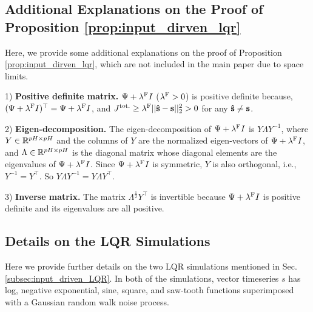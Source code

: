\subsection{Additional Explanations on the Proof of Proposition \ref{prop:input_dirven_lqr}}
Here, we provide some additional explanations on the proof of Proposition \ref{prop:input_dirven_lqr}, which are not included in the main paper due to space limits. 

1) \textbf{Positive definite matrix.} $\Psi + \lambda^{\mathrm{F}} I$ ($\lambda^{\mathrm{F}} > 0$) is positive definite because, $(\Psi + \lambda^{\mathrm{F}} I)^\top = \Psi + \lambda^{\mathrm{F}} I$, and $J^{\mathrm{tot.}} \geq \lambda^{\mathrm{F}} || \bold{\hat{s}} - \bold{s}||_2^2 > 0$ for any $\bold{\hat{s}} \neq \bold{s}$.

2) \textbf{Eigen-decomposition.}
The eigen-decomposition of $\Psi + \lambda^{\mathrm{F}} I$ is $Y \Lambda Y^{-1}$, where $Y \in \mathbb{R}^{pH \times pH}$ and the columns of $Y$ are the normalized eigen-vectors of $\Psi + \lambda^{\mathrm{F}} I$, and $\Lambda \in \mathbb{R}^{pH \times pH}$ is the diagonal matrix whose diagonal elements are the eigenvalues of $\Psi + \lambda^{\mathrm{F}} I$. Since $\Psi + \lambda^{\mathrm{F}} I$ is symmetric, $Y$ is also orthogonal, i.e., $Y^{-1} = Y^\top$. So $Y \Lambda Y^{-1} = Y \Lambda Y^\top$.

3) \textbf{Inverse matrix.} The matrix $\Lambda^{\frac{1}{2}}Y^\top$ is invertible because $\Psi + \lambda^{\mathrm{F}} I$ is positive definite and its eigenvalues are all positive.


\subsection{Details on the LQR Simulations}

Here we provide further details on the two LQR simulations mentioned in Sec. \ref{subsec:input_driven_LQR}. In both of the simulations, vector timeseries $s$ has log, negative exponential, sine, square, and saw-tooth functions superimposed with a Gaussian random walk noise process.


